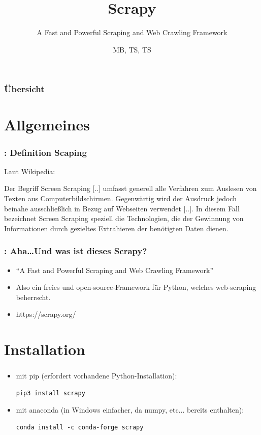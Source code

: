 \documentclass{beamer}
\title{Scrapy}
\subtitle{A Fast and Powerful Scraping and Web Crawling Framework}
\author{MB, TS, TS}
\begin{document}
\frame{\titlepage}
\begin{frame}
	\frametitle{Übersicht}
	\tableofcontents
\end{frame}
\section{Allgemeines}
\begin{frame}[fragile]
\frametitle{\insertsection{}: Definition Scaping}
		Laut Wikipedia:
		
		Der Begriff Screen Scraping [..] umfasst
		generell alle Verfahren zum Auslesen von Texten aus Computerbildschirmen. 
		Gegenwärtig wird der Ausdruck jedoch beinahe ausschließlich in Bezug auf Webseiten 
		verwendet [..]. In diesem Fall bezeichnet Screen Scraping speziell die
		Technologien, die der Gewinnung von Informationen durch gezieltes Extrahieren der benötigten Daten dienen.
\end{frame}

\begin{frame}[fragile]
\frametitle{\insertsection{}: Aha\ldots Und was ist dieses Scrapy?}
	\begin{itemize}
		\item "`A Fast and Powerful Scraping and Web Crawling Framework"'
		\item Also ein freies und open-source-Framework für Python, welches
		web-scraping beherrscht.
		\item https://scrapy.org/
	
	\end{itemize}
\end{frame}


\section{Installation}
\begin{frame}[fragile]
	\frametitle{\insertsection}
	\begin{itemize}
		\item mit pip (erfordert vorhandene Python-Installation):
			\begin{lstlisting}
pip3 install scrapy
			\end{lstlisting}
		\item mit anaconda (in Windows einfacher, da numpy, etc... bereits enthalten):
			\begin{lstlisting}
conda install -c conda-forge scrapy
			\end{lstlisting}
	\end{itemize}
\end{frame}
\end{document}

